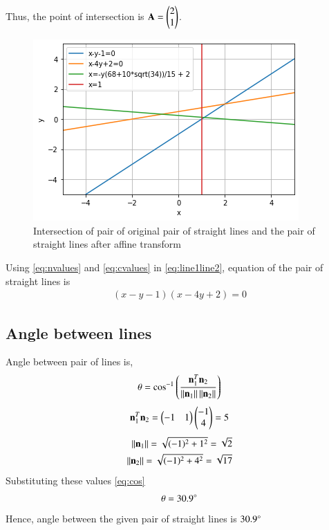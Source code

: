 \documentclass[journal,12pt,twocolumn]{IEEEtran}
\begin{document}
Thus, the point of intersection is $\mathbf{A} = \begin{pmatrix}2 \\ 1\end{pmatrix}$.
\renewcommand{\thefigure}{1}
\begin{figure}[h!]
    \centering
    \includegraphics[width=\columnwidth]{assignment3.png}
    \caption{Intersection of pair of original pair of straight lines and the pair of straight lines after affine transform}
    \label{fig:fig1}
\end{figure}

Using \eqref{eq:nvalues} and \eqref{eq:cvalues} in \eqref{eq:line1line2}, equation of the pair of straight lines is
\begin{align}
    (x-y-1)(x-4y+2) = 0
\end{align}

\subsection{Angle between lines}
Angle between pair of lines is,
\begin{align}\label{eq:cos}
    \theta = \cos^{-1}\left(\frac{\mathbf{n}_1^T\mathbf{n}_2}{\left\lVert\mathbf{n}_1\right\rVert\left\lVert\mathbf{n}_2\right\rVert}\right)
\end{align}
\begin{align}
    \mathbf{n}_1^T\mathbf{n}_2 = \begin{pmatrix}-1 & 1\end{pmatrix}\begin{pmatrix}-1 \\ 4\end{pmatrix} = 5 \label{eq:a2} 
\end{align}
\begin{align}
    \left\lVert\mathbf{n}_1\right\rVert=\sqrt{(-1)^2+1^2}=\sqrt{2}\\
    \left\lVert\mathbf{n}_2\right\rVert=\sqrt{(-1)^2+4^2}=\sqrt{17} \label{eq:}
\end{align}
Substituting these values \eqref{eq:cos}
\begin{align}
    \theta = 30.9\degree
\end{align}
Hence, angle between the given pair of straight lines is $30.9\degree$
\end{document}
